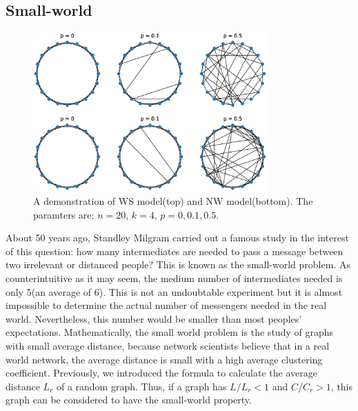 \documentclass[12pt]{article}
\begin{document}
\subsection{Small-world}
\label{small_world}

\begin{figure}[h]
    \includegraphics[width = 0.8\textwidth]{small_world_network_model.eps}
    \centering
    \caption{A demonstration of WS model(top) and NW model(bottom). The paramters are: $n=20$, $k=4$, $p=0,0.1,0.5$.}
    \label{fig:small_world_models}
\end{figure}
About 50 years ago, Standley Milgram\cite{milgram1967small} carried out a famous study in the interest of this question: how many intermediates are needed to pass a message between two irrelevant or distanced people? This is known as the small-world problem. As counterintuitive as it may seem, the medium number of intermediates needed is only 5(an average of 6)\cite{milgram1967small}. This is not an undoubtable experiment but it is almost impossible to determine the actual number of messengers needed in the real world. Nevertheless, this number would be smaller than most peoples' expectations. Mathematically, the small world problem is the study of graphs with small average distance, because network scientists believe that in a real world network, the average distance is small with a high average clustering coefficient. Previously, we introduced the formula to calculate the average distance $L_r$ of a random graph. Thus, if a graph has $L/L_r <1$ and $C/C_r>1$, this graph can be considered to have the small-world property.\\
\par
\end{document}
